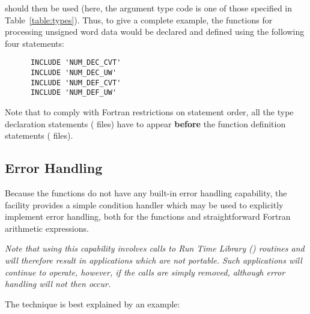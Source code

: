 should then be used (here, the argument type code  is one of
those specified in Table~\ref{table:types}). 
Thus, to give a complete example, the  functions for processing
unsigned word data would be declared and defined using the following four
statements:

\begin{verbatim}
      INCLUDE 'NUM_DEC_CVT'
      INCLUDE 'NUM_DEC_UW'
      INCLUDE 'NUM_DEF_CVT'
      INCLUDE 'NUM_DEF_UW'
\end{verbatim}

Note that to comply with Fortran restrictions on statement order, all the
type declaration statements ( files) have to appear {\bf
before} the function definition statements ( files). 

\subsection{ Error Handling}
\label{section:num:error}

Because the  functions do not have any built-in error handling
capability, the  facility provides a simple  condition
handler which may be used to explicitly implement error handling, both for
the  functions and straightforward Fortran arithmetic
expressions. 

{\em Note that using this capability involves calls to  Run
Time Library () routines and will therefore result in applications
which are not portable.
Such applications will continue to operate, however, if the  calls
are simply removed, although error handling will not then occur.
}

The technique is best explained by an example:

